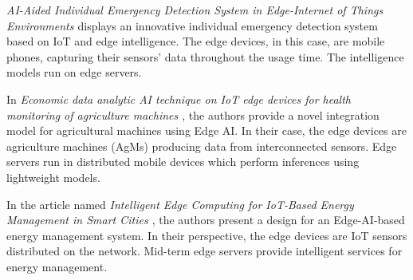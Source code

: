 
\textit{AI-Aided Individual Emergency Detection System in Edge-Internet of Things Environments \cite{yang2021ai}} displays an innovative individual emergency detection system based on IoT and edge intelligence. The edge devices, in this case, are mobile phones, capturing their sensors' data throughout the usage time. The intelligence models run on edge servers. 



In \textit{Economic data analytic AI technique on IoT edge devices for health
monitoring of agriculture machines \cite{gupta2020economic}}, the authors provide a novel integration model for agricultural machines using Edge AI. In their case, the edge devices are agriculture machines (AgMs) producing data from interconnected sensors. Edge servers run in distributed mobile devices which perform inferences using lightweight models.



In the article named \textit{Intelligent Edge Computing for IoT-Based Energy Management in Smart Cities \cite{liu2019intelligent}}, the authors present a design for an Edge-AI-based energy management system. In their perspective, the edge devices are IoT sensors distributed on the network. Mid-term edge servers provide intelligent services for energy management.


